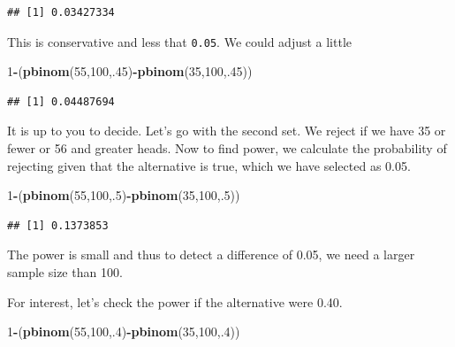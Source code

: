 \documentclass[]{book}
\newenvironment{Shaded}{\begin{snugshade}}{\end{snugshade}}
\newcommand{\KeywordTok}[1]{\textcolor[rgb]{0.13,0.29,0.53}{\textbf{#1}}}
\newcommand{\DecValTok}[1]{\textcolor[rgb]{0.00,0.00,0.81}{#1}}
\newcommand{\OperatorTok}[1]{\textcolor[rgb]{0.81,0.36,0.00}{\textbf{#1}}}
\newcommand{\NormalTok}[1]{#1}
\theoremstyle{definition}
\theoremstyle{definition}
\theoremstyle{definition}
\theoremstyle{remark}
\begin{document}
\begin{verbatim}
## [1] 0.03427334
\end{verbatim}

This is conservative and less that \texttt{0.05}. We could adjust a
little

\begin{Shaded}
\begin{Highlighting}[]
\DecValTok{1}\OperatorTok{-}\NormalTok{(}\KeywordTok{pbinom}\NormalTok{(}\DecValTok{55}\NormalTok{,}\DecValTok{100}\NormalTok{,.}\DecValTok{45}\NormalTok{)}\OperatorTok{-}\KeywordTok{pbinom}\NormalTok{(}\DecValTok{35}\NormalTok{,}\DecValTok{100}\NormalTok{,.}\DecValTok{45}\NormalTok{))}
\end{Highlighting}
\end{Shaded}

\begin{verbatim}
## [1] 0.04487694
\end{verbatim}

It is up to you to decide. Let's go with the second set. We reject if we
have 35 or fewer or 56 and greater heads. Now to find power, we
calculate the probability of rejecting given that the alternative is
true, which we have selected as 0.05.

\begin{Shaded}
\begin{Highlighting}[]
\DecValTok{1}\OperatorTok{-}\NormalTok{(}\KeywordTok{pbinom}\NormalTok{(}\DecValTok{55}\NormalTok{,}\DecValTok{100}\NormalTok{,.}\DecValTok{5}\NormalTok{)}\OperatorTok{-}\KeywordTok{pbinom}\NormalTok{(}\DecValTok{35}\NormalTok{,}\DecValTok{100}\NormalTok{,.}\DecValTok{5}\NormalTok{))}
\end{Highlighting}
\end{Shaded}

\begin{verbatim}
## [1] 0.1373853
\end{verbatim}

The power is small and thus to detect a difference of 0.05, we need a
larger sample size than 100.

For interest, let's check the power if the alternative were 0.40.

\begin{Shaded}
\begin{Highlighting}[]
\DecValTok{1}\OperatorTok{-}\NormalTok{(}\KeywordTok{pbinom}\NormalTok{(}\DecValTok{55}\NormalTok{,}\DecValTok{100}\NormalTok{,.}\DecValTok{4}\NormalTok{)}\OperatorTok{-}\KeywordTok{pbinom}\NormalTok{(}\DecValTok{35}\NormalTok{,}\DecValTok{100}\NormalTok{,.}\DecValTok{4}\NormalTok{))}
\end{Highlighting}
\end{Shaded}
\end{document}
